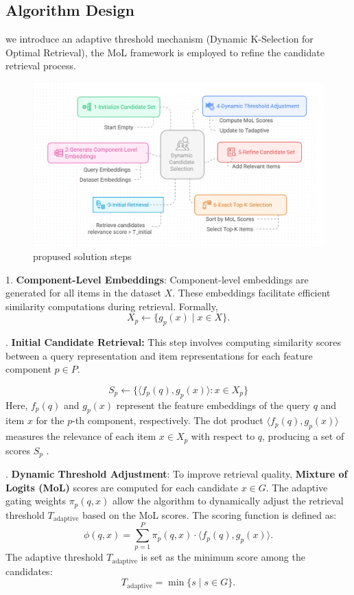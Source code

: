\subsection{Algorithm Design}
we introduce an adaptive threshold mechanism
(Dynamic K-Selection for Optimal Retrieval), the MoL framework is employed to refine the
candidate retrieval process. 
\begin{figure}[ht]
	\centering
	\includegraphics[width=0.7\linewidth]{Figures/propused _solution_steps.png}
	\caption{propused solution steps}
	\label{propused _solution_steps}	
\end{figure}

\noindent

1. \textbf{Component-Level Embeddings}:  
Component-level embeddings are generated for all items in the dataset \(X\). These embeddings facilitate efficient similarity computations during retrieval. Formally,
\begin{equation}
	X_p \leftarrow \{g_p(x) \mid x \in X\}.
\end{equation}

.\textbf{ Initial Candidate Retrieval:} This step involves computing similarity scores between a query representation and item representations for each feature component $p \in P$.  

\begin{equation}
	S_p \gets  \{ \langle f_p(q), g_p(x) \rangle : x \in X_p \}
	\label{eq:initial_retrieval}
\end{equation}
Here, $f_p(q)$ and $g_p(x)$ represent the feature embeddings of the query $q$ and item $x$ for the $p$-th component, respectively. The dot product $\langle f_p(q), g_p(x) \rangle$ measures the relevance of each item $x \in X_p$ with respect to $q$, producing a set of scores $S_p$ .


. \textbf{Dynamic Threshold Adjustment}:  
To improve retrieval quality, \textbf{Mixture of Logits (MoL)} scores are computed for each candidate \(x \in G\). The adaptive gating weights \(\pi_p(q, x)\) allow the algorithm to dynamically adjust the retrieval threshold \(T_{\text{adaptive}}\) based on the MoL scores. The scoring function is defined as:
\begin{equation}
	\phi(q, x) = \sum_{p=1}^{P} \pi_p(q, x) \cdot \langle f_p(q), g_p(x) \rangle.
	\label{similarity_function}
\end{equation}
The adaptive threshold \(T_{\text{adaptive}}\) is set as the minimum score among the candidates:
\begin{equation}
	T_{\text{adaptive}} = \min\{s \mid s \in G\}.
\end{equation}

